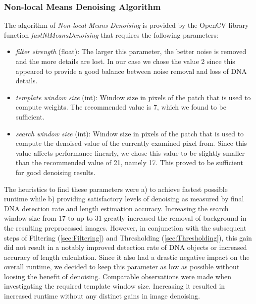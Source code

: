 \documentclass{article}
\begin{document}
\subsubsection{Non-local Means Denoising Algorithm}
The algorithm of \textit{Non-local Means Denoising} is provided by the OpenCV library function \textit{fastNlMeansDenoising} that requires the following parameters:
\begin{itemize}
	\item \textit{filter strength} (float): The larger this parameter, the better noise is removed and the more details are lost. In our case we chose the value 2 since this appeared to provide a good balance between noise removal and loss of DNA details.
	\item \textit{template window size} (int): Window size in pixels of the patch that is used to compute weights. The recommended value is 7, which we found to be sufficient.
	\item \textit{search window size} (int): Window size in pixels of the patch that is used to compute the denoised value of the currently examined pixel from. Since this value affects performance linearly, we chose this value to be slightly smaller than the recommended value of 21, namely 17. This proved to be sufficient for good denoising results.
\end{itemize}
The heuristics to find these parameters were a) to achieve fastest possible runtime while b) providing satisfactory levels of denoising as measured by final DNA detection rate and length estimation accuracy. Increasing the search window size from 17 to up to 31 greatly increased the removal of background in the resulting preprocessed images. However, in conjunction with the subsequent steps of Filtering (\ref{sec:Filtering}) and Thresholding (\ref{sec:Thresholding}), this gain did not result in a notably improved detection rate of DNA objects or increased accuracy of length calculation. Since it also had a drastic negative impact on the overall runtime, we decided to keep this parameter as low as possible without loosing the benefit of denoising. Comparable observations were made when investigating the required template window size. Increasing it resulted in increased runtime without any distinct gains in image denoising. \\
\end{document}
